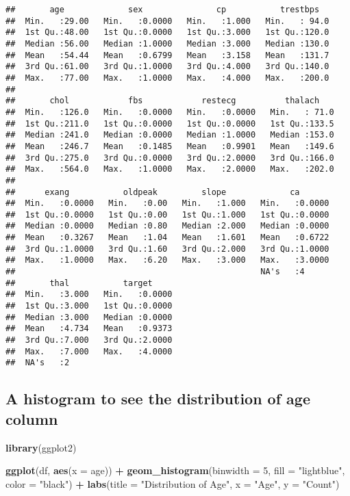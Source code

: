 \documentclass[
]{article}
\newenvironment{Shaded}{\begin{snugshade}}{\end{snugshade}}
\newcommand{\AttributeTok}[1]{\textcolor[rgb]{0.13,0.29,0.53}{#1}}
\newcommand{\DecValTok}[1]{\textcolor[rgb]{0.00,0.00,0.81}{#1}}
\newcommand{\FunctionTok}[1]{\textcolor[rgb]{0.13,0.29,0.53}{\textbf{#1}}}
\newcommand{\NormalTok}[1]{#1}
\newcommand{\SpecialCharTok}[1]{\textcolor[rgb]{0.81,0.36,0.00}{\textbf{#1}}}
\newcommand{\StringTok}[1]{\textcolor[rgb]{0.31,0.60,0.02}{#1}}
\begin{document}
\begin{verbatim}
##       age             sex               cp           trestbps    
##  Min.   :29.00   Min.   :0.0000   Min.   :1.000   Min.   : 94.0  
##  1st Qu.:48.00   1st Qu.:0.0000   1st Qu.:3.000   1st Qu.:120.0  
##  Median :56.00   Median :1.0000   Median :3.000   Median :130.0  
##  Mean   :54.44   Mean   :0.6799   Mean   :3.158   Mean   :131.7  
##  3rd Qu.:61.00   3rd Qu.:1.0000   3rd Qu.:4.000   3rd Qu.:140.0  
##  Max.   :77.00   Max.   :1.0000   Max.   :4.000   Max.   :200.0  
##                                                                  
##       chol            fbs            restecg          thalach     
##  Min.   :126.0   Min.   :0.0000   Min.   :0.0000   Min.   : 71.0  
##  1st Qu.:211.0   1st Qu.:0.0000   1st Qu.:0.0000   1st Qu.:133.5  
##  Median :241.0   Median :0.0000   Median :1.0000   Median :153.0  
##  Mean   :246.7   Mean   :0.1485   Mean   :0.9901   Mean   :149.6  
##  3rd Qu.:275.0   3rd Qu.:0.0000   3rd Qu.:2.0000   3rd Qu.:166.0  
##  Max.   :564.0   Max.   :1.0000   Max.   :2.0000   Max.   :202.0  
##                                                                   
##      exang           oldpeak         slope             ca        
##  Min.   :0.0000   Min.   :0.00   Min.   :1.000   Min.   :0.0000  
##  1st Qu.:0.0000   1st Qu.:0.00   1st Qu.:1.000   1st Qu.:0.0000  
##  Median :0.0000   Median :0.80   Median :2.000   Median :0.0000  
##  Mean   :0.3267   Mean   :1.04   Mean   :1.601   Mean   :0.6722  
##  3rd Qu.:1.0000   3rd Qu.:1.60   3rd Qu.:2.000   3rd Qu.:1.0000  
##  Max.   :1.0000   Max.   :6.20   Max.   :3.000   Max.   :3.0000  
##                                                  NA's   :4       
##       thal           target      
##  Min.   :3.000   Min.   :0.0000  
##  1st Qu.:3.000   1st Qu.:0.0000  
##  Median :3.000   Median :0.0000  
##  Mean   :4.734   Mean   :0.9373  
##  3rd Qu.:7.000   3rd Qu.:2.0000  
##  Max.   :7.000   Max.   :4.0000  
##  NA's   :2
\end{verbatim}

\subsection{A histogram to see the distribution of age
column}\label{a-histogram-to-see-the-distribution-of-age-column}

\begin{Shaded}
\begin{Highlighting}[]
\FunctionTok{library}\NormalTok{(ggplot2)}

\FunctionTok{ggplot}\NormalTok{(df, }\FunctionTok{aes}\NormalTok{(}\AttributeTok{x =}\NormalTok{ age)) }\SpecialCharTok{+}
  \FunctionTok{geom\_histogram}\NormalTok{(}\AttributeTok{binwidth =} \DecValTok{5}\NormalTok{, }\AttributeTok{fill =} \StringTok{"lightblue"}\NormalTok{, }\AttributeTok{color =} \StringTok{"black"}\NormalTok{) }\SpecialCharTok{+}
  \FunctionTok{labs}\NormalTok{(}\AttributeTok{title =} \StringTok{"Distribution of Age"}\NormalTok{, }\AttributeTok{x =} \StringTok{"Age"}\NormalTok{, }\AttributeTok{y =} \StringTok{"Count"}\NormalTok{)}
\end{Highlighting}
\end{Shaded}
\end{document}
